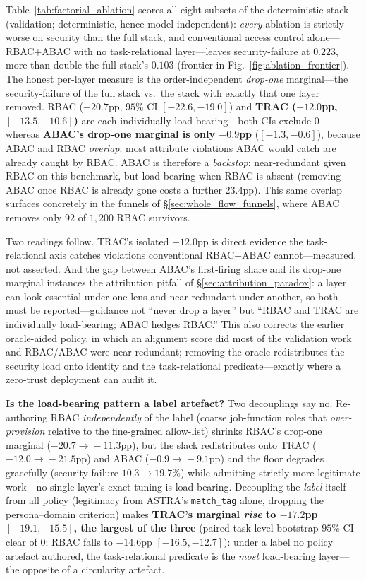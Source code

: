 \documentclass[sigconf,review,anonymous]{acmart}
\begin{document}
Table~\ref{tab:factorial_ablation} scores all eight subsets of the deterministic stack (validation; deterministic, hence model-independent): \emph{every} ablation is strictly worse on security than the full stack, and conventional access control alone---RBAC$+$ABAC with no task-relational layer---leaves security-failure at $0.223$, more than double the full stack's $0.103$ (frontier in Fig.~\ref{fig:ablation_frontier}). The honest per-layer measure is the order-independent \emph{drop-one} marginal---the security-failure of the full stack vs.\ the stack with exactly that one layer removed. RBAC ($-20.7$pp, $95\%$ CI $[-22.6,-19.0]$) and \textbf{TRAC ($-12.0$pp, $[-13.5,-10.6]$)} are each individually load-bearing---both CIs exclude $0$---whereas \textbf{ABAC's drop-one marginal is only $-0.9$pp} ($[-1.3,-0.6]$), because ABAC and RBAC \emph{overlap}: most attribute violations ABAC would catch are already caught by RBAC. ABAC is therefore a \emph{backstop}: near-redundant given RBAC on this benchmark, but load-bearing when RBAC is absent (removing ABAC once RBAC is already gone costs a further $23.4$pp). This same overlap surfaces concretely in the funnels of \S\ref{sec:whole_flow_funnels}, where ABAC removes only $92$ of $1{,}200$ RBAC survivors.

Two readings follow. TRAC's isolated $-12.0$pp is direct evidence the task-relational axis catches violations conventional RBAC$+$ABAC cannot---measured, not asserted. And the gap between ABAC's first-firing share and its drop-one marginal instances the attribution pitfall of \S\ref{sec:attribution_paradox}: a layer can look essential under one lens and near-redundant under another, so both must be reported---guidance not ``never drop a layer'' but ``RBAC and TRAC are individually load-bearing; ABAC hedges RBAC.'' This also corrects the earlier oracle-aided policy, in which an alignment score did most of the validation work and RBAC/ABAC were near-redundant; removing the oracle redistributes the security load onto identity and the task-relational predicate---exactly where a zero-trust deployment can audit it.

\textbf{Is the load-bearing pattern a label artefact?} Two decouplings say no. Re-authoring RBAC \emph{independently} of the label (coarse job-function roles that \emph{over-provision} relative to the fine-grained allow-list) shrinks RBAC's drop-one marginal ($-20.7\!\to\!-11.3$pp), but the slack redistributes onto TRAC ($-12.0\!\to\!-21.5$pp) and ABAC ($-0.9\!\to\!-9.1$pp) and the floor degrades gracefully (security-failure $10.3\!\to\!19.7\%$) while admitting strictly more legitimate work---no single layer's exact tuning is load-bearing. Decoupling the \emph{label} itself from all policy (legitimacy from ASTRA's \texttt{match\_tag} alone, dropping the persona--domain criterion) makes \textbf{TRAC's marginal \emph{rise} to $-17.2$pp $[-19.1,-15.5]$, the largest of the three} (paired task-level bootstrap $95\%$ CI clear of $0$; RBAC falls to $-14.6$pp $[-16.5,-12.7]$): under a label no policy artefact authored, the task-relational predicate is the \emph{most} load-bearing layer---the opposite of a circularity artefact.
\end{document}
